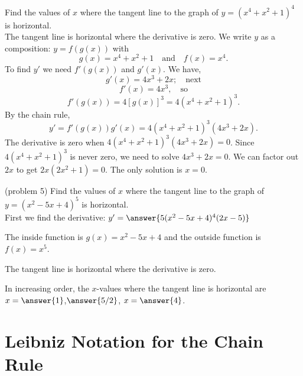 \documentclass[handout]{ximera}
\begin{document}
\begin{example}[example 5]
Find the values of $x$ where the tangent line to the graph of $y = (x^4 + x^2 + 1)^4$ is horizontal.\\
The tangent line is horizontal where the derivative is zero. We write $y$ as a composition: $y = f(g(x))$ with
\[
g(x) = x^4 + x^2 + 1 \quad \text{and} \quad f(x) = x^4.
\]
To find $y'$ we need $f'(g(x))$ and $g'(x)$. We have,
\[
g'(x) = 4x^3 + 2x; \quad \text{next}
\]
\[
f'(x) = 4x^3, \quad \text{so}
\]
\[
f'(g(x)) = 4[g(x)]^3 = 4(x^4 + x^2 + 1)^3.
\]
By the chain rule,
\[
y' = f'(g(x))g'(x) = 4(x^4 + x^2 + 1)^3(4x^3 + 2x).
\]
The derivative is zero when $4(x^4 + x^2 + 1)^3(4x^3 + 2x) = 0$. 
Since $4(x^4 + x^2 + 1)^3$ is never zero, we need to solve $4x^3 + 2x = 0$. 
We can factor out $2x$ to get $2x(2x^2 + 1) = 0$. The only solution is $x = 0$.
\end{example}

\begin{problem}(problem 5)
Find the values of $x$ where the tangent line to the graph of $y = (x^2 - 5x + 4)^5$ is horizontal.\\
First we find the derivative: $y' = \answer{5(x^2 - 5x + 4)^4(2x - 5)}$\\
\begin{hint}
The inside function is $g(x) = x^2 - 5x + 4$ and the outside function is $f(x) = x^5$.
\end{hint}
\begin{hint}
The tangent line is horizontal where the derivative is zero. 
\end{hint}
In increasing order, the $x$-values where the tangent line is horizontal are $x = \answer{1}$,$\answer{5/2}$, $x = \answer{4}$.
\end{problem}

\section{Leibniz Notation for the Chain Rule}
\end{document}
